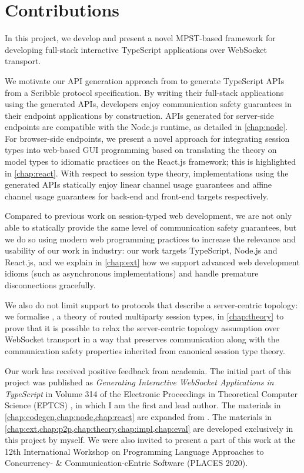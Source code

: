 \section{Contributions}

In this project, we develop and present a novel
MPST-based framework for developing full-stack
interactive TypeScript applications over WebSocket transport.

We motivate our API generation approach from 
\cite{Hybrid2016,PureScript2019} to generate TypeScript APIs
from a Scribble protocol specification.
By writing their full-stack applications using
the generated APIs, developers enjoy 
communication safety guarantees in their endpoint
applications by construction.
APIs generated for server-side endpoints
are compatible with the Node.js runtime,
as detailed in \cref{chap:node}.
For browser-side endpoints,
we present a novel approach for integrating
session types into web-based GUI programming based on
translating the theory on model types \cite{MVU2020}
to idiomatic practices on the React.js framework;
this is highlighted in \cref{chap:react}.
With respect to session type theory, implementations using
the generated APIs statically enjoy linear channel usage
guarantees and affine channel usage guarantees for back-end
and front-end targets respectively.

Compared to previous work 
\cite{Exceptional,PureScript2019,MVU2020,LINKS} on
session-typed web development, 
we are not only able to
statically provide the same level of communication safety
guarantees, but we do so
using modern web programming practices to increase
the relevance and usability of our work in industry:
our work targets TypeScript, Node.js and React.js,
and we explain in \cref{chap:ext} how we support advanced
web development idioms (such as asynchronous implementations)
and handle premature disconnections gracefully.

We also do not limit support to protocols that describe
a server-centric topology: we formalise \newtheory,
a theory of routed multiparty session types, in 
\cref{chap:theory} to prove that it is possible to relax the
server-centric topology assumption over WebSocket transport in a way 
that preserves communication along with the communication safety 
properties inherited from canonical session type theory.

Our work has received positive feedback from academia.
The initial part of this project was published as 
\emph{Generating Interactive WebSocket 
Applications in TypeScript} in Volume 314 of the Electronic Proceedings
in Theoretical Computer Science (EPTCS) \cite{PLACES2020},
in which I am the first and lead author.
The materials in \cref{chap:codegen,chap:node,chap:react}
are expanded from \cite{PLACES2020}.
The materials in 
\cref{chap:ext,chap:p2p,chap:theory,chap:impl,chap:eval}
are developed exclusively in this project by myself.
We were also invited to present a part of this work
at the 12th International Workshop on
Programming Language Approaches to Concurrency- \& 
Communication-cEntric Software (PLACES 2020).

